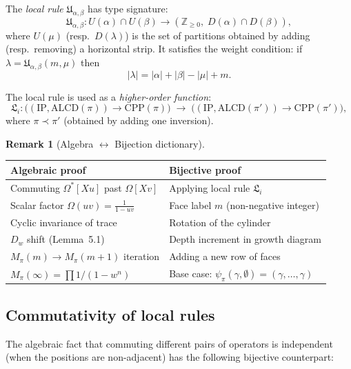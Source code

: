 \documentclass[11pt]{article}
\newcommand{\Z}{\mathbb{Z}}
\newcommand{\CPP}{\mathrm{CPP}}
\newcommand{\IP}{\mathrm{IP}}
\newcommand{\ALCD}{\mathrm{ALCD}}
\theoremstyle{plain}
\theoremstyle{definition}
\newtheorem{remark}[theorem]{Remark}
\begin{document}
The \emph{local rule} $\mathfrak{U}_{\alpha,\beta}$ has type signature:
\[
\mathfrak{U}_{\alpha,\beta} : U(\alpha) \cap U(\beta) \to (\Z_{\geq 0},\; D(\alpha) \cap D(\beta)),
\]
where $U(\mu)$ (resp.\ $D(\lambda)$) is the set of partitions obtained by adding (resp.\ removing) a horizontal strip.
It satisfies the weight condition: if $\lambda = \mathfrak{U}_{\alpha,\beta}(m,\mu)$ then
\begin{equation}\label{eq:weight-cond}
|\lambda| = |\alpha| + |\beta| - |\mu| + m.
\end{equation}

The local rule is used as a \emph{higher-order function}:
\begin{equation}
\mathfrak{L}_i : \big((\IP, \ALCD(\pi)) \to \CPP(\pi)\big) \;\longrightarrow\; \big((\IP, \ALCD(\pi')) \to \CPP(\pi')\big),
\end{equation}
where $\pi \prec \pi'$ (obtained by adding one inversion).

\begin{remark}[Algebra $\leftrightarrow$ Bijection dictionary]\label{rem:dictionary}
\begin{center}
\begin{tabular}{l|l}
\textbf{Algebraic proof} & \textbf{Bijective proof} \\ \hline
Commuting $\Omega^*[Xu]$ past $\Omega[Xv]$ & Applying local rule $\mathfrak{L}_i$ \\
Scalar factor $\Omega(uv) = \frac{1}{1-uv}$ & Face label $m$ (non-negative integer) \\
Cyclic invariance of trace & Rotation of the cylinder \\
$D_w$ shift (Lemma~5.1) & Depth increment in growth diagram \\
$M_\pi(m) \to M_\pi(m+1)$ iteration & Adding a new row of faces \\
$M_\pi(\infty) = \prod 1/(1-w^n)$ & Base case: $\psi_\pi(\gamma, \emptyset) = (\gamma, \ldots, \gamma)$ \\
\end{tabular}
\end{center}
\end{remark}

\subsection{Commutativity of local rules}
The algebraic fact that commuting different pairs of operators is independent (when the positions are non-adjacent) has the following bijective counterpart:
\end{document}

